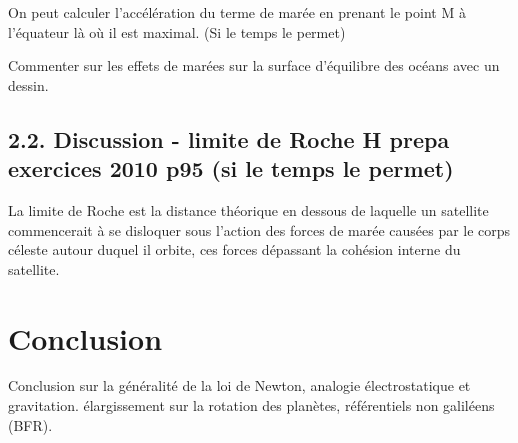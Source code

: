 \documentclass[french, a4paper, 10pt, twocolumn, landscape]{article}
\begin{document}
On peut calculer l'accélération du terme de marée en prenant le point M à l'équateur là où il est maximal. (Si le temps le permet)

Commenter sur les effets de marées sur la surface d'équilibre des océans avec un dessin. 

\subsection*{2.2. Discussion - limite de Roche H prepa exercices 2010 p95 (si le temps le permet)}

La limite de Roche est la distance théorique en dessous de laquelle un satellite commencerait à se disloquer sous l'action des forces de marée causées par le corps céleste autour duquel il orbite, ces forces dépassant la cohésion interne du satellite.

\section*{Conclusion}

Conclusion sur la généralité de la loi de Newton, analogie électrostatique et gravitation. élargissement sur la rotation des planètes, référentiels non galiléens (BFR).
\end{document}
